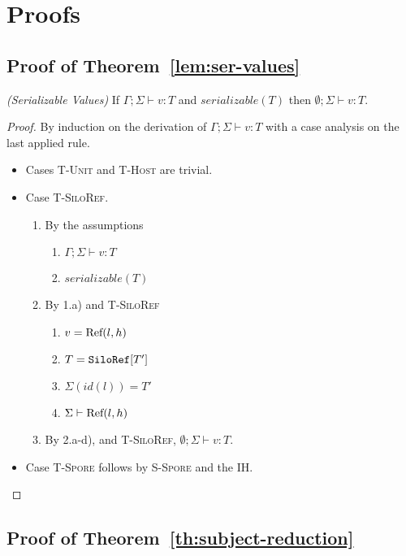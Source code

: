 \section{Proofs}

\subsection{Proof of Theorem~\ref{lem:ser-values}}\label{app:ser-values}

\begin{thmun}
\emph{(Serializable Values)}
If $\Gamma ; \Sigma \vdash v : T$ and $serializable(T)$ then $\emptyset ; \Sigma \vdash v : T$.
\end{thmun}
\begin{proof}
By induction on the derivation of $\Gamma ; \Sigma \vdash v : T$ with a case analysis on the last applied rule.

\begin{itemize}
\item Cases \textsc{T-Unit} and \textsc{T-Host} are trivial.

\item Case \textsc{T-SiloRef}.
\begin{enumerate}
\item By the assumptions
  \begin{enumerate}[label=(\alph*)]
  \item $\Gamma ; \Sigma \vdash v : T$
  \item $serializable(T)$
  \end{enumerate}
\item By 1.a) and \textsc{T-SiloRef}
  \begin{enumerate}[label=(\alph*)]
  \item $v = {\textrm{Ref}(l, h)}$
  \item $T = \texttt{SiloRef}[T']$
  \item $\Sigma(id(l)) = T'$
  \item $\Sigma \vdash {\textrm{Ref}(l, h)}$
  \end{enumerate}
\item By 2.a-d), and \textsc{T-SiloRef}, $\emptyset ; \Sigma \vdash v : T$.
\end{enumerate}

\item Case \textsc{T-Spore} follows by \textsc{S-Spore} and the IH.
\end{itemize}
\end{proof}


\subsection{Proof of Theorem~\ref{th:subject-reduction}}\label{app:subject-reduction}

